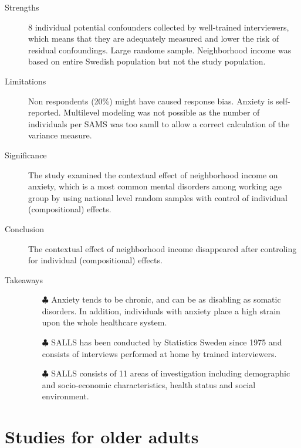 \documentclass{article}
\begin{document}
\begin{itemize}
\begin{itemize}
\begin{description}
			\item[Strengths] 8 individual potential confounders collected by well-trained interviewers, which means that they are adequately measured and lower the risk of residual confoundings. Large randome sample. Neighborhood income was based on entire Swedish population but not the study population.
			\item[Limitations] Non respondents (20\%) might have caused response bias. Anxiety is self-reported. Multilevel modeling was not possible as the number of individuals per SAMS was too samll to allow a correct calculation of the variance measure.
			\item[Significance] 
				The study examined the contextual effect of neighborhood income on anxiety, which is a most common mental disorders among working age group by using national level random samples with control of individual (compositional) effects.
			\item[Conclusion] 
				The contextual effect of neighborhood income disappeared after controling for individual (compositional) effects.
			\item[Takeaways] \mbox{}\par
				\begin{itemize}
					\item[$\clubsuit$] Anxiety tends to be chronic, and can be as disabling as somatic disorders. In addition, individuals with anxiety place a high strain upon the whole healthcare system.
					\item[$\clubsuit$] SALLS has been conducted by Statistics Sweden since 1975 and consists of interviews performed at home by trained interviewers.
					\item[$\clubsuit$] SALLS consists of 11 areas of investigation including demographic and socio-economic characteristics, health status and social environment.
				\end{itemize}
		\end{description}
\end{itemize}

\section{Studies for older adults}

\end{itemize}
\end{document}
